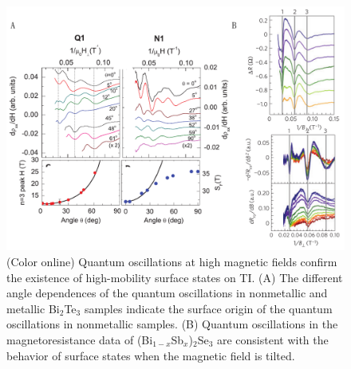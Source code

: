 \begin{figure}[htb]
  \begin{center}            
\includegraphics[width=0.9\linewidth]{ch-intro/figures/TI_transport.pdf} 
\caption{\label{TI_transport} (Color online) 
Quantum oscillations at high magnetic fields confirm the existence of high-mobility surface states on TI. (A) The different angle dependences of the quantum oscillations in nonmetallic and metallic Bi$_2$Te$_3$ samples indicate the surface origin of the quantum oscillations in nonmetallic samples. (B) Quantum oscillations in the magnetoresistance data of (Bi$_{1-x}$Sb$_x$)$_2$Se$_3$ are consistent with the behavior of surface states when the magnetic field is tilted.
} 
  \end{center}
\end{figure}


